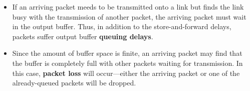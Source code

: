 \begin{itemize}
\item If an arriving packet meeds to be transmitted onto a link but finds the link busy with the transmission of another packet, the arriving packet must wait in the output buffer. Thus, in addition to the store-and-forward delays, packets suffer output buffer \textbf{queuing delays}.

\item Since the amount of buffer space is finite, an arriving packet may find that the buffer is completely full with other packets waiting for transmission. In this case, \textbf{packet loss} will occur---either the arriving packet or one of the already-queued packets will be dropped.



\end{itemize}